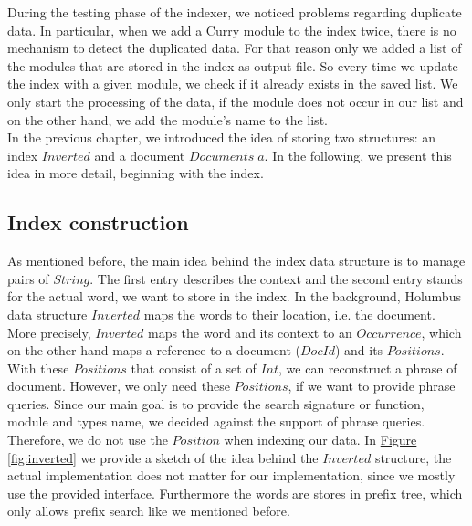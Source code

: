\documentclass[%
	pdftex,%
	a4paper,%
	oneside,%
	chapterprefix,%
	headsepline,%
	12pt%
]{scrbook}
\newcommand{\Conid}[1]{\mathit{#1}}
\newcommand{\Varid}[1]{\mathit{#1}}
\begin{document}
During the testing phase of the indexer, we noticed problems regarding
duplicate data. %
In particular, when we add a Curry module to the index twice, there is
no mechanism to detect the duplicated data. %
For that reason only we added a list of the modules that are stored in
the index as output file. %
So every time we update the index with a given module, we check if it
already exists in the saved list. %
We only start the processing of the data, if the module does not occur
in our list and on the other hand, we add the module's name to the
list.\\

In the previous chapter, we introduced the idea of storing two
structures: an index \ensuremath{\Conid{Inverted}} and a document \ensuremath{\Conid{Documents}\;\Varid{a}}. %
In the following, we present this idea in more detail, beginning with
the index. %

\subsection{Index construction}
As mentioned before, the main idea behind the index data structure is
to manage pairs of \ensuremath{\Conid{String}}. %
The first entry describes the context and the second entry stands for
the actual word, we want to store in the index. %
In the background, Holumbus data structure \ensuremath{\Conid{Inverted}} maps the words
to their location, i.e. the document. %
More precisely, \ensuremath{\Conid{Inverted}} maps the word and its context to an
\ensuremath{\Conid{Occurrence}}, which on the other hand maps a reference to a document
(\ensuremath{\Conid{DocId}}) and its \ensuremath{\Conid{Positions}}. %
With these \ensuremath{\Conid{Positions}} that consist of a set of \ensuremath{\Conid{Int}}, we can
reconstruct a phrase of document. %
However, we only need these \ensuremath{\Conid{Positions}}, if we want to provide phrase
queries. %
Since our main goal is to provide the search signature or function,
module and types name, we decided against the support of phrase
queries. %
Therefore, we do not use the \ensuremath{\Conid{Position}} when indexing our data. %
In \hyperref[fig:inverted]{Figure \ref{fig:inverted}} we provide a
sketch of the idea behind the \ensuremath{\Conid{Inverted}} structure, the actual
implementation does not matter for our implementation, since we mostly
use the provided interface. %
Furthermore the words are stores in prefix tree, which only allows
prefix search like we mentioned before. %
\end{document}

